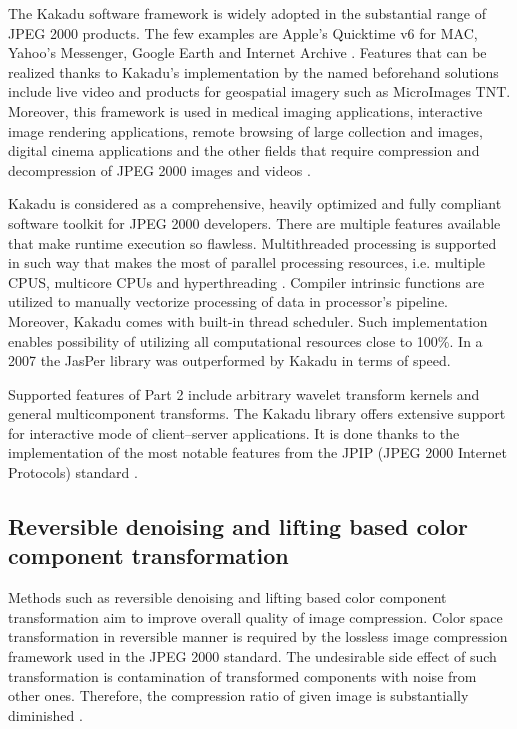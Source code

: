 The Kakadu software framework is widely adopted in the substantial range of JPEG 2000 products. The few examples
are Apple's Quicktime v6 for MAC, Yahoo's Messenger, Google Earth and Internet Archive \cite{jpeg_suite}. 
Features that can be realized thanks to Kakadu's implementation by the named beforehand solutions include live video
and products for geospatial imagery such as MicroImages TNT. Moreover, this framework is used in medical imaging applications,
interactive image rendering applications, remote browsing of large collection and images, digital cinema applications
and the other fields that require compression and decompression of JPEG 2000 images and videos \cite{jpeg_suite}.

Kakadu is considered as a comprehensive, heavily optimized and fully compliant software toolkit for JPEG 2000
developers. There are multiple features available that make runtime execution so flawless. Multithreaded
processing is supported in such way that makes the most of parallel processing resources, i.e. multiple CPUS,
multicore CPUs and hyperthreading \cite{jpeg_suite}. Compiler intrinsic functions are utilized to manually
vectorize processing of data in processor's pipeline. Moreover, Kakadu comes with built-in thread scheduler.
Such implementation enables possibility of utilizing all computational resources close to 100\%.
In a 2007 the JasPer library was outperformed by Kakadu in terms of speed.

Supported features of Part 2 include arbitrary wavelet transform kernels and general multicomponent transforms.
The Kakadu library offers extensive support for interactive mode of client–server applications. It is done
thanks to the implementation of the most notable features from the JPIP (JPEG 2000 Internet Protocols) standard \cite{jpeg_suite}.

\subsection{Reversible denoising and lifting based color component transformation}

Methods such as reversible denoising and lifting based color component transformation aim to improve
overall quality of image compression. Color space transformation in reversible manner is required
by the lossless image compression framework used in the JPEG 2000 standard. The undesirable side effect
of such transformation is contamination of transformed components with noise from other ones.
Therefore, the compression ratio of given image is substantially diminished \cite{denoising}.

